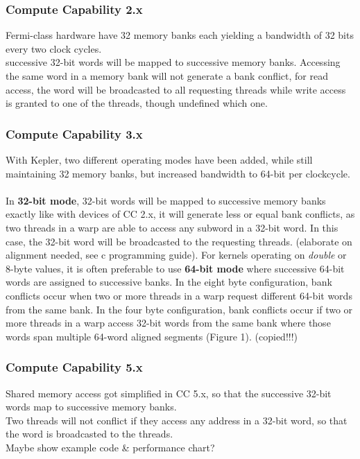\subsubsection{Compute Capability 2.x}
Fermi-class hardware have 32 memory banks each yielding a bandwidth of 32 bits every two clock cycles.\\
successive 32-bit words will be mapped to successive memory banks. Accessing the same word in a memory bank will not generate a bank conflict, for read access, the word will be broadcasted to all requesting threads while write access is granted to one of the threads, though undefined which one.\\ 
\subsubsection{Compute Capability 3.x}
With Kepler, two different operating modes have been added, while still maintaining 32 memory banks, but increased bandwidth to 64-bit per clockcycle.\\\\
In \textbf{32-bit mode}, 32-bit words will be mapped to successive memory banks exactly like with devices of CC 2.x, it will generate less or equal bank conflicts, as two threads in a warp are able to access any subword in a 32-bit word. In this case, the 32-bit word will be broadcasted to the requesting threads. (elaborate on alignment needed, see c programming guide).
For kernels operating on \emph{double} or 8-byte values, it is often preferable to use \textbf{64-bit mode} where successive 64-bit words are assigned to successive banks.
In the eight byte configuration, bank conflicts occur when two or more threads in a warp request different 64-bit words from the same bank. In the four byte configuration, bank conflicts occur if two or more threads in a warp access 32-bit words from the same bank where those words span multiple 64-word aligned segments (Figure 1). (copied!!!) \\
\subsubsection{Compute Capability 5.x}
Shared memory access got simplified in CC 5.x, so that the successive 32-bit words map to successive memory banks.\\
Two threads will not conflict if they access any address in a 32-bit word, so that the word is broadcasted to the threads.\\
Maybe show example code \& performance chart?
